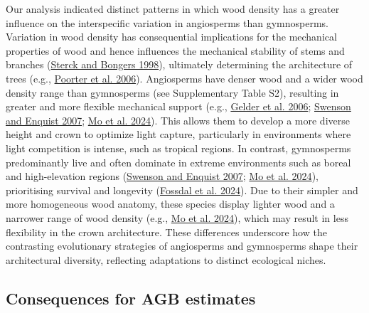 \documentclass[
  12pt,
  letterpaper,
  DIV=11,
  numbers=noendperiod]{scrartcl}
\begin{document}
Our analysis indicated distinct patterns in which wood density has a
greater influence on the interspecific variation in angiosperms than
gymnosperms. Variation in wood density has consequential implications
for the mechanical properties of wood and hence influences the
mechanical stability of stems and branches
(\protect\hyperlink{ref-Sterck1998}{Sterck and Bongers 1998}),
ultimately determining the architecture of trees (e.g.,
\protect\hyperlink{ref-Poorter2006}{Poorter et al. 2006}). Angiosperms
have denser wood and a wider wood density range than gymnosperms (see
Supplementary Table S2), resulting in greater and more flexible
mechanical support (e.g., \protect\hyperlink{ref-Gelder2006}{Gelder et
al. 2006}; \protect\hyperlink{ref-Swenson2007}{Swenson and Enquist
2007}; \protect\hyperlink{ref-Mo2024}{Mo et al. 2024}). This allows them
to develop a more diverse height and crown to optimize light capture,
particularly in environments where light competition is intense, such as
tropical regions. In contrast, gymnosperms predominantly live and often
dominate in extreme environments such as boreal and high-elevation
regions (\protect\hyperlink{ref-Swenson2007}{Swenson and Enquist 2007};
\protect\hyperlink{ref-Mo2024}{Mo et al. 2024}), prioritising survival
and longevity (\protect\hyperlink{ref-Fossdal2024}{Fossdal et al.
2024}). Due to their simpler and more homogeneous wood anatomy, these
species display lighter wood and a narrower range of wood density (e.g.,
\protect\hyperlink{ref-Mo2024}{Mo et al. 2024}), which may result in
less flexibility in the crown architecture. These differences underscore
how the contrasting evolutionary strategies of angiosperms and
gymnosperms shape their architectural diversity, reflecting adaptations
to distinct ecological niches.

\hypertarget{consequences-for-agb-estimates}{%
\subsection{Consequences for AGB
estimates}\label{consequences-for-agb-estimates}}
\end{document}
